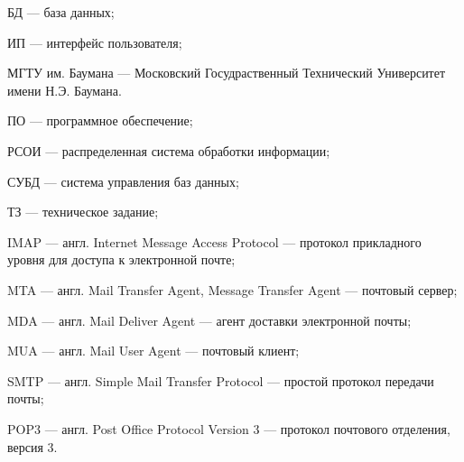 \Abbreviations %
\begin{description}
\item{БД} --- база данных;
\item{ИП} --- интерфейс пользователя;
\item{МГТУ им. Баумана} --- Московский Госудраственный Технический Университет имени Н.Э. Баумана.
\item{ПО} --- программное обеспечение;
\item{РСОИ} --- распределенная система обработки информации;
\item{СУБД} --- система управления баз данных;
\item{ТЗ} --- техническое задание;
\item{IMAP} --- англ. Internet Message Access Protocol --- протокол прикладного уровня для доступа к электронной почте;
\item{MTA} --- англ. Mail Transfer Agent, Message Transfer Agent --- почтовый сервер;
\item{MDA} --- англ. Mail Deliver Agent --- агент доставки электронной почты;
\item{MUA} --- англ. Mail User Agent --- почтовый клиент;
\item{SMTP} --- англ. Simple Mail Transfer Protocol ---  простой протокол передачи почты;
\item{POP3} --- англ. Post Office Protocol Version 3 --- протокол почтового отделения, версия 3.

\end{description}

